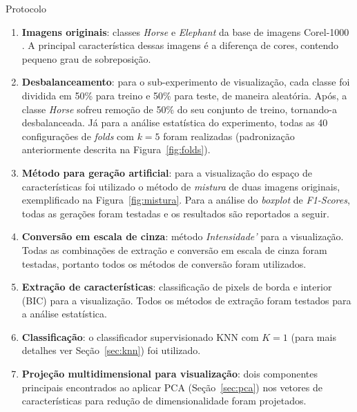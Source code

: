 \documentclass{beamer}
\begin{document}
\begin{frame}{Protocolo}
  \begin{enumerate}
  \item \textbf{Imagens originais}: classes \emph{Horse} e \emph{Elephant} da base de imagens Corel-1000 \cite{Wang2001}. A principal característica dessas imagens é a diferença de cores, contendo pequeno grau de sobreposição.

  \item \textbf{Desbalanceamento}: para o sub-experimento de visualização, cada classe foi dividida em 50\% para treino e 50\% para teste, de maneira aleatória. Após, a classe \emph{Horse} sofreu remoção de 50\% do seu conjunto de treino, tornando-a desbalanceada. Já para a análise estatística do experimento, todas as 40 configurações de \textit{folds} com $k=5$ foram realizadas (padronização anteriormente descrita na Figura~\ref{fig:folds}).

  \item \textbf{Método para geração artificial}: para a visualização do espaço de características foi utilizado o método de \emph{mistura} de duas imagens originais, exemplificado na Figura~\ref{fig:mistura}. Para a análise do \textit{boxplot} de \textit{F1-Scores}, todas as gerações foram testadas e os resultados são reportados a seguir.

  \item \textbf{Conversão em escala de cinza}: método \emph{Intensidade'} para a visualização. Todas as combinações de extração e conversão em escala de cinza foram testadas, portanto todos os métodos de conversão foram utilizados.

  \item \textbf{Extração de características}: classificação de pixels de borda e interior (BIC) para a visualização. Todos os métodos de extração foram testados para a análise estatística.

  \item \textbf{Classificação}: o classificador supervisionado KNN com $K=1$ (para mais detalhes ver Seção~\ref{sec:knn}) foi utilizado.

  \item \textbf{Projeção multidimensional para visualização}: dois componentes principais encontrados ao aplicar PCA (Seção~\ref{sec:pca}) nos vetores de características para redução de dimensionalidade foram projetados.
  \end{enumerate}
\end{frame}
\end{document}
